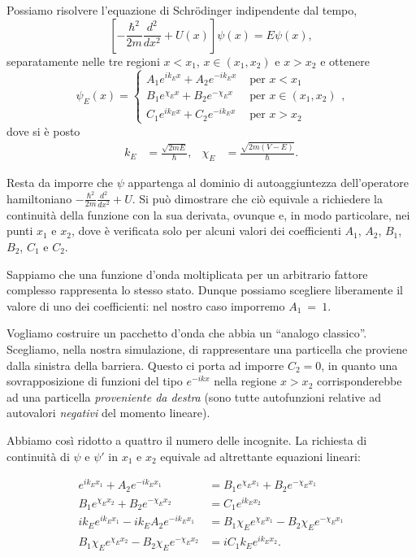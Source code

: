 Possiamo risolvere l'equazione di Schr\"{o}dinger indipendente dal tempo,
\[
\left[-\frac{\hbar^2}{2m}\frac{d^2}{dx^2} + U(x)\right]\psi(x) = E\psi(x) ,
\]
separatamente nelle tre regioni $x<x_1$, $x\in(x_1,x_2)$ e $x>x_2$ e
ottenere
\begin{equation}
\psi_E(x) = \begin{cases}
	A_1 e^{ik_{E}x} + A_2 e^{-ik_{E}x}	&\text{ per } x<x_1\\
	B_1 e^{\chi_{E} x} + B_2 e^{-\chi_{E} x}&\text{ per } x\in(x_1, x_2)\\
	C_1 e^{ik_{E}x} + C_2 e^{-ik_{E}x}      &\text{ per } x>x_2
\end{cases},     \label{psi nelle3zone}
\end{equation} 
dove si è posto
\begin{align*}
k_{E} &= \frac{\sqrt{2mE}}{\hbar}, & \chi_{E} &= \frac{\sqrt{2m(V-E)}}{\hbar}.
\end{align*}

Resta da imporre che $\psi$ appartenga al dominio di autoaggiuntezza 
dell'operatore hamiltoniano $-\frac{\hbar^2}{2m}\frac{d^2}{dx^2} + U$.
Si può dimostrare che ciò equivale a richiedere la continuità della 
funzione con la sua derivata, ovunque e, in modo particolare, nei
punti $x_1$ e $x_2$, dove è verificata solo per alcuni valori dei 
coefficienti $A_1$, $A_2$, $B_1$, $B_2$, $C_1$ e $C_2$.

Sappiamo che una funzione d'onda moltiplicata per un arbitrario
fattore complesso rappresenta lo stesso stato. Dunque possiamo
scegliere liberamente il valore di uno dei coefficienti: nel nostro 
caso imporremo $A_1~=~1$.

Vogliamo costruire un pacchetto d'onda che abbia un ``analogo
classico''. Scegliamo, nella nostra simulazione, di rappresentare
una particella che proviene dalla sinistra della barriera. Questo
ci porta ad imporre $C_2=0$, in quanto una sovrapposizione di funzioni
del tipo $e^{-ikx}$ nella regione $x>x_2$ corrisponderebbe ad una 
particella \emph{proveniente da destra} (sono tutte autofunzioni
relative ad autovalori \emph{negativi} del momento lineare).

Abbiamo così ridotto a quattro il numero delle incognite. La richiesta
di continuità di $\psi$ e $\psi'$ in $x_1$ e $x_2$ equivale
ad altrettante equazioni lineari:

\begin{equation}\begin{aligned}
e^{ik_{E}x_1} + A_2 e^{-ik_{E}x_1} &= B_1 e^{\chi_{E}x_1} + B_2 e^{-\chi_{E}x_1} \\
B_1 e^{\chi_{E} x_2} + B_2 e^{-\chi_{E} x_2} &= C_1 e^{ik_{E}x_2} \\
ik_{E} e^{ik_{E}x_1} -ik_{E} A_2 e^{-ik_{E}x_1} &=B_1\chi_{E} e^{\chi_{E} x_1}-B_2 \chi_{E} e^{-\chi_{E} x_1}\\
B_1\chi_{E} e^{\chi_{E} x_2} -B_2 \chi_{E} e^{-\chi_{E} x_2} &= i C_1 k_{E} e^{ik_{E}x_2} .
\end{aligned} \label{sistema_lineare_coeff}  \end{equation} 




